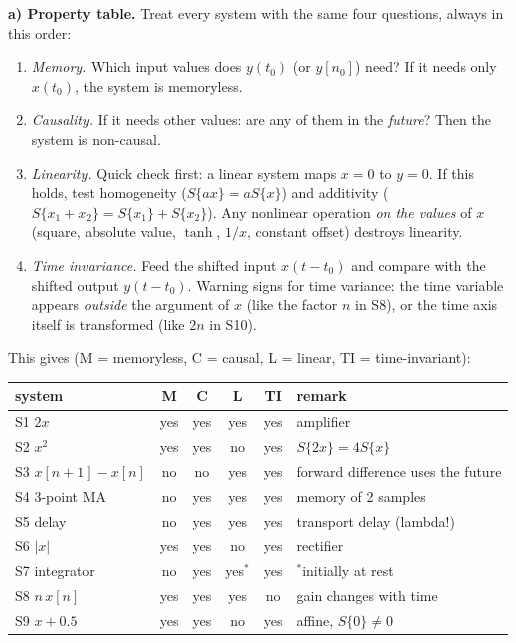 \begin{solution}
\textbf{a) Property table.} Treat every system with the same four questions,
always in this order:
\begin{enumerate}[label=Step \arabic*:,leftmargin=*,itemsep=1pt]
  \item \emph{Memory.} Which input values does $y(t_0)$ (or $y[n_0]$) need?
    If it needs only $x(t_0)$, the system is memoryless.
  \item \emph{Causality.} If it needs other values: are any of them in the
    \emph{future}? Then the system is non-causal.
  \item \emph{Linearity.} Quick check first: a linear system maps $x=0$ to
    $y=0$. If this holds, test homogeneity ($S\{ax\}=aS\{x\}$) and additivity
    ($S\{x_1+x_2\}=S\{x_1\}+S\{x_2\}$). Any nonlinear operation \emph{on the
    values} of $x$ (square, absolute value, $\tanh$, $1/x$, constant offset)
    destroys linearity.
  \item \emph{Time invariance.} Feed the shifted input $x(t-t_0)$ and compare
    with the shifted output $y(t-t_0)$. Warning signs for time variance: the
    time variable appears \emph{outside} the argument of $x$ (like the factor
    $n$ in S8), or the time axis itself is transformed (like $2n$ in S10).
\end{enumerate}
This gives (M = memoryless, C = causal, L = linear, TI = time-invariant):
\begin{center}
\small
\begin{tabular}{@{}lccccl@{}}
\toprule
system & M & C & L & TI & remark \\
\midrule
S1 $2x$          & yes & yes & yes & yes & amplifier \\
S2 $x^2$         & yes & yes & no  & yes & $S\{2x\}=4S\{x\}$ \\
S3 $x[n+1]-x[n]$ & no  & no  & yes & yes & forward difference uses the future \\
S4 3-point MA    & no  & yes & yes & yes & memory of 2 samples \\
S5 delay         & no  & yes & yes & yes & transport delay (lambda!) \\
S6 $|x|$         & yes & yes & no  & yes & rectifier \\
S7 integrator    & no  & yes & yes$^*$ & yes & $^*$initially at rest \\
S8 $n\,x[n]$     & yes & yes & yes & no  & gain changes with time \\
S9 $x+0.5$       & yes & yes & no  & yes & affine, $S\{0\}\neq0$ \\

\end{tabular}
\end{center}
\end{solution}
